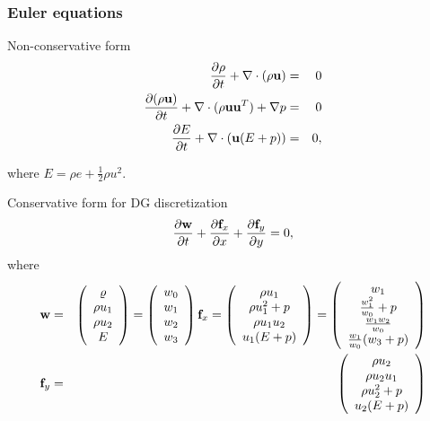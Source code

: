 \documentclass{beamer}
\begin{document}
\begin{frame}
\frametitle{Euler equations}
Non-conservative form
\begin{eqnarray}
{\partial\rho\over\partial t} + \nabla\cdot(\rho{\bf u}) & = & 0 \\
{\partial(\rho{\bf u})\over\partial t} + \nabla\cdot(\rho{\bf u}{\bf u}^T) + \nabla p & = & 0\\
{\partial E\over\partial t} + \nabla\cdot({\bf u}(E+p)) & = & 0,
\end{eqnarray}
\begin{center}
where $E = \rho e + \frac{1}{2} \rho u^2$.
\end{center}
\end{frame}
\begin{frame}
Conservative form for DG discretization
\begin{equation}
{\partial{\bf w}\over \partial t} +{\partial{\bf f}_x\over \partial x} +{\partial{\bf f}_y\over \partial y} = 0,
\end{equation}
\vspace{-2mm}
where
\begin{eqnarray}
\nonumber
{\bf w} & = &\left(\begin{array}{c} \varrho\\ \rho u_1\\ \rho u_2\\ E \end{array} \right) 
		  = \left(\begin{array}{c} w_0 \\ w_1 \\ w_2 \\ w_3 \\ \end{array} \right)
{\bf f}_x = \left(\begin{array}{c} \rho u_1\\ \rho u_1^2 + p \\ \rho u_1 u_2\\ u_1(E+p) \end{array} \right)
			 = \left(\begin{array}{c} w_1\\ \frac{w_1^2}{w_0} + p\\ \frac{w_1w_2}{w_0}\\ \frac{w_1}{w_0}(w_3+p) \end{array} \right)\\
{\bf f}_y & = & \left(\begin{array}{c} \rho u_2\\ \rho u_2 u_1\\ \rho u_2^2 + p\\ u_2(E+p) \end{array} \right) 

\end{eqnarray}
\end{frame}
\end{document}
